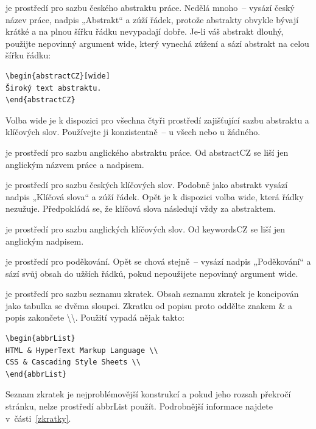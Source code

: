 \documentclass[FM,BP]{tulthesis}
\newcommand{\argument}[1]{{\ttfamily\color{\tulcolor}#1}}
\newcommand{\argumentindex}[1]{\argument{#1}\index{#1}}
\newcommand{\prostredi}[1]{\argumentindex{#1}}
\newenvironment{myquote}{\begin{list}{}{\setlength\leftmargin\parindent}\item[]}{\end{list}}
\newenvironment{listing}{\begin{myquote}\color{\tulcolor}}{\end{myquote}}
\begin{document}
\begin{description}
\item[\prostredi{abstractCZ}] je prostředí pro sazbu českého abstraktu práce.
Nedělá mnoho~-- vysází český název práce, nadpis „Abstrakt“ a zúží řádek,
protože abstrakty obvykle bývají krátké a na plnou šířku řádku nevypadají
dobře. Je-li váš abstrakt dlouhý, použijte nepovinný argument \argument{wide},
který vynechá zúžení a sází abstrakt na celou šířku řádku:

\begin{listing}
\begin{verbatim}
\begin{abstractCZ}[wide]
Široký text abstraktu.
\end{abstractCZ}
\end{verbatim}
\end{listing}

Volba \argument{wide} je k dispozici pro všechna čtyři prostředí zajišťující
sazbu abstraktu a klíčových slov. Používejte ji konzistentně~-- u všech nebo u
žádného.

\item[\prostredi{abstractEN}] je prostředí pro sazbu anglického abstraktu práce.
Od \argument{abstractCZ} se liší jen anglickým názvem práce a nadpisem.

\item[\prostredi{keywordsCZ}] je prostředí pro sazbu českých klíčových slov.
Podobně jako abstrakt vysází nadpis „Klíčová slova“ a zúží řádek. Opět je k
dispozici volba \argument{wide}, která řádky nezužuje. Předpokládá se, že
klíčová slova následují vždy za abstraktem.

\item[\prostredi{keywordsEN}] je prostředí pro sazbu anglických klíčových slov.
Od \argument{keywordsCZ} se liší jen anglickým nadpisem.

\item[\prostredi{acknowledgement}] je prostředí pro poděkování. Opět se chová
stejně~-- vysází nadpis „Poděkování“ a sází svůj obsah do užších řádků, pokud
nepoužijete nepovinný argument \argument{wide}.

\item[\prostredi{abbrList}] je prostředí pro sazbu seznamu zkratek. Obsah
seznamu zkratek je koncipován jako tabulka se dvěma sloupci. Zkratku od popisu
proto oddělte znakem \argument{\&} a popis zakončete
\argument{\textbackslash\textbackslash}. Použití vypadá nějak takto:

{\color{\tulcolor}
\begin{verbatim}
\begin{abbrList}
HTML & HyperText Markup Language \\
CSS & Cascading Style Sheets \\
\end{abbrList}
\end{verbatim}}

Seznam zkratek je nejproblémovější konstrukcí a pokud jeho rozsah překročí
stránku, nelze prostředí \argument{abbrList} použít. Podrobnější informace
najdete v~části~\ref{zkratky}.

\end{description}
\end{document}
